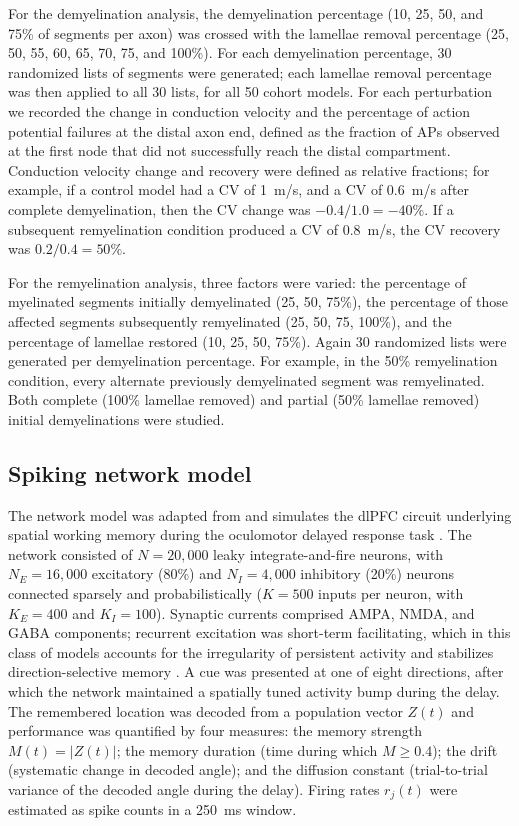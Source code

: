 \documentclass[11pt]{article}
\begin{document}
For the demyelination analysis, the demyelination percentage (10, 25, 50, and 75\% of segments per axon) was crossed with the lamellae removal percentage (25, 50, 55, 60, 65, 70, 75, and 100\%). For each demyelination percentage, 30 randomized lists of segments were generated; each lamellae removal percentage was then applied to all 30 lists, for all 50 cohort models. For each perturbation we recorded the change in conduction velocity and the percentage of action potential failures at the distal axon end, defined as the fraction of APs observed at the first node that did not successfully reach the distal compartment. Conduction velocity change and recovery were defined as relative fractions; for example, if a control model had a CV of 1~m/s, and a CV of 0.6~m/s after complete demyelination, then the CV change was $-0.4/1.0 = -40\%$. If a subsequent remyelination condition produced a CV of 0.8~m/s, the CV recovery was $0.2/0.4 = 50\%$.

For the remyelination analysis, three factors were varied: the percentage of myelinated segments initially demyelinated (25, 50, 75\%), the percentage of those affected segments subsequently remyelinated (25, 50, 75, 100\%), and the percentage of lamellae restored (10, 25, 50, 75\%). Again 30 randomized lists were generated per demyelination percentage. For example, in the 50\% remyelination condition, every alternate previously demyelinated segment was remyelinated. Both complete (100\% lamellae removed) and partial (50\% lamellae removed) initial demyelinations were studied.

\subsection{Spiking network model}

The network model was adapted from \citet{hansel2013short} and simulates the dlPFC circuit underlying spatial working memory during the oculomotor delayed response task \citep{funahashi1989mnemonic,compte2000synaptic}. The network consisted of $N = 20{,}000$ leaky integrate-and-fire neurons, with $N_E = 16{,}000$ excitatory (80\%) and $N_I = 4{,}000$ inhibitory (20\%) neurons connected sparsely and probabilistically ($K = 500$ inputs per neuron, with $K_E = 400$ and $K_I = 100$). Synaptic currents comprised AMPA, NMDA, and GABA components; recurrent excitation was short-term facilitating, which in this class of models accounts for the irregularity of persistent activity and stabilizes direction-selective memory \citep{hansel2013short,mongillo2008synaptic}. A cue was presented at one of eight directions, after which the network maintained a spatially tuned activity bump during the delay. The remembered location was decoded from a population vector $Z(t)$ and performance was quantified by four measures: the memory strength $M(t) = |Z(t)|$; the memory duration (time during which $M \geq 0.4$); the drift (systematic change in decoded angle); and the diffusion constant (trial-to-trial variance of the decoded angle during the delay). Firing rates $r_j(t)$ were estimated as spike counts in a 250~ms window.
\end{document}
